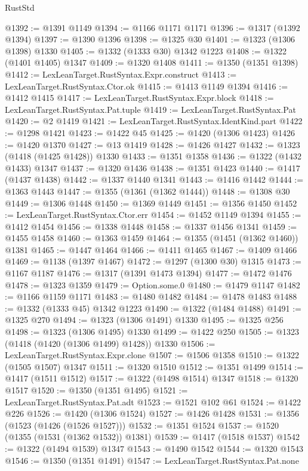 \begin{lexlean}{RustStd}
\begin{coremodule}
@1392 := @1391 @1149
@1394 := @1166 @1171 @1171
@1396 := @1317 (@1392 @1394)
@1397 := @1390 @1396
@1398 := @1325 @30
@1401 := @1323 (@1306 @1398) @1330
@1405 := @1332 (@1333 @30) @1342 @1223
@1408 := @1322 (@1401 @1405) @1347
@1409 := @1320 @1408
@1411 := @1350 (@1351 @1398)
@1412 := LexLeanTarget.RustSyntax.Expr.construct
@1413 := LexLeanTarget.RustSyntax.Ctor.ok
@1415 := @1413 @1149 @1394
@1416 := @1412 @1415
@1417 := LexLeanTarget.RustSyntax.Expr.block
@1418 := LexLeanTarget.RustSyntax.Pat.tuple
@1419 := LexLeanTarget.RustSyntax.Pat
@1420 := @2 @1419
@1421 := LexLeanTarget.RustSyntax.IdentKind.part
@1422 := @1298 @1421
@1423 := @1422 @45
@1425 := @1420 (@1306 @1423)
@1426 := @1420 @1370
@1427 := @13 @1419
@1428 := @1426 @1427
@1432 := @1323 (@1418 (@1425 @1428)) @1330
@1433 := @1351 @1358
@1436 := @1322 (@1432 @1433) @1347
@1437 := @1320 @1436
@1438 := @1351 @1423
@1440 := @1417 (@1437 @1438)
@1442 := @1337 @1440 @1341
@1443 := @1416 @1442
@1444 := @1363 @1443
@1447 := @1355 (@1361 (@1362 @1444))
@1448 := @1308 @30
@1449 := @1306 @1448
@1450 := @1369 @1449
@1451 := @1356 @1450
@1452 := LexLeanTarget.RustSyntax.Ctor.err
@1454 := @1452 @1149 @1394
@1455 := @1412 @1454
@1456 := @1338 @1448
@1458 := @1337 @1456 @1341
@1459 := @1455 @1458
@1460 := @1363 @1459
@1464 := @1355 (@1451 (@1362 @1460)) @1381
@1465 := @1447 @1464
@1466 := @1411 @1465
@1467 := @1409 @1466
@1469 := @1138 (@1397 @1467)
@1472 := @1297 (@1300 @30) @1315
@1473 := @1167 @1187
@1476 := @1317 (@1391 @1473 @1394)
@1477 := @1472 @1476
@1478 := @1323 @1359
@1479 := Option.some.{0}
@1480 := @1479 @1147
@1482 := @1166 @1159 @1171
@1483 := @1480 @1482
@1484 := @1478 @1483
@1488 := @1332 (@1333 @45) @1342 @1223
@1490 := @1322 (@1484 @1488)
@1491 := @1325 @270
@1494 := @1323 (@1306 @1491) @1330
@1495 := @1325 @256
@1498 := @1323 (@1306 @1495) @1330
@1499 := @1422 @250
@1505 := @1323 (@1418 (@1420 (@1306 @1499) @1428)) @1330
@1506 := LexLeanTarget.RustSyntax.Expr.clone
@1507 := @1506 @1358
@1510 := @1322 (@1505 @1507) @1347
@1511 := @1320 @1510
@1512 := @1351 @1499
@1514 := @1417 (@1511 @1512)
@1517 := @1322 (@1498 @1514) @1347
@1518 := @1320 @1517
@1520 := @1350 (@1351 @1495)
@1521 := LexLeanTarget.RustSyntax.Pat.adt
@1523 := @1521 @102 @61
@1524 := @1422 @226
@1526 := @1420 (@1306 @1524)
@1527 := @1426 @1428
@1531 := @1356 (@1523 (@1426 (@1526 @1527)))
@1532 := @1351 @1524
@1537 := @1520 (@1355 (@1531 (@1362 @1532)) @1381)
@1539 := @1417 (@1518 @1537)
@1542 := @1322 (@1494 @1539) @1347
@1543 := @1490 @1542
@1544 := @1320 @1543
@1546 := @1350 (@1351 @1491)
@1547 := LexLeanTarget.RustSyntax.Pat.none

\end{coremodule}
\end{lexlean}
